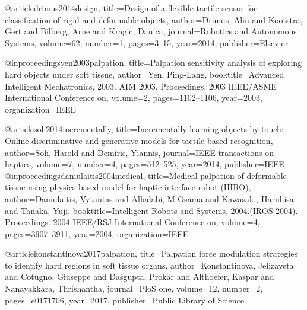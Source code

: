 @article{drimus2014design,
	title={Design of a flexible tactile sensor for classification of rigid and deformable objects},
	author={Drimus, Alin and Kootstra, Gert and Bilberg, Arne and Kragic, Danica},
	journal={Robotics and Autonomous Systems},
	volume={62},
	number={1},
	pages={3--15},
	year={2014},
	publisher={Elsevier}
}

@inproceedings{yen2003palpation,
	title={Palpation sensitivity analysis of exploring hard objects under soft tissue},
	author={Yen, Ping-Lang},
	booktitle={Advanced Intelligent Mechatronics, 2003. AIM 2003. Proceedings. 2003 IEEE/ASME International Conference on},
	volume={2},
	pages={1102--1106},
	year={2003},
	organization={IEEE}
}

@article{soh2014incrementally,
	title={Incrementally learning objects by touch: Online discriminative and generative models for tactile-based recognition},
	author={Soh, Harold and Demiris, Yiannis},
	journal={IEEE transactions on haptics},
	volume={7},
	number={4},
	pages={512--525},
	year={2014},
	publisher={IEEE}
}
@inproceedings{daniulaitis2004medical,
	title={Medical palpation of deformable tissue using physics-based model for haptic interface robot (HIRO)},
	author={Daniulaitis, Vytautas and Alhalabi, M Osama and Kawasaki, Haruhisa and Tanaka, Yuji},
	booktitle={Intelligent Robots and Systems, 2004.(IROS 2004). Proceedings. 2004 IEEE/RSJ International Conference on},
	volume={4},
	pages={3907--3911},
	year={2004},
	organization={IEEE}
}

@article{konstantinova2017palpation,
	title={Palpation force modulation strategies to identify hard regions in soft tissue organs},
	author={Konstantinova, Jelizaveta and Cotugno, Giuseppe and Dasgupta, Prokar and Althoefer, Kaspar and Nanayakkara, Thrishantha},
	journal={PloS one},
	volume={12},
	number={2},
	pages={e0171706},
	year={2017},
	publisher={Public Library of Science}
}

 
 





